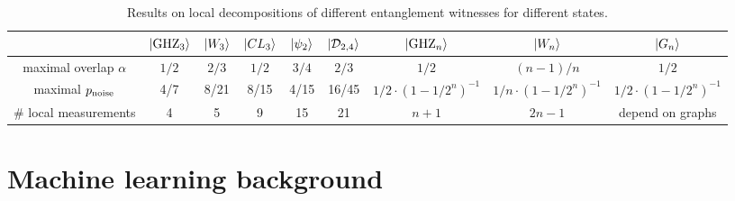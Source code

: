 \begin{table}[!ht]
\centering
\begin{tabular}{c|c|c|c|c|c|c|c|c}
	 & $\ket{\text{GHZ}_3}$ & $\ket{W_3}$ & $\ket{CL_3}$ & $\ket{\psi_2}$ & $\ket{\mathcal{D}_{2,4}}$ & $\ket{\text{GHZ}_n}$ & $\ket{W_n}$ & $\ket{G_n}$ \\
	\hline
	maximal overlap $\alpha$ & $1/2$ & $2/3$ & $1/2$ & $3/4$ & $2/3$ & $1/2$ & $(n-1)/n$ & $1/2$ \\
	maximal $p_{\text{noise}}$ & 4/7 & 8/21 & 8/15 & 4/15 & 16/45 & $1/2 \cdot (1-1/2^n)^{-1}$ & $1/n \cdot (1-1/2^n)^{-1}$ & $1/2 \cdot (1-1/2^n)^{-1}$ \\
	\# local measurements & 4 & 5 & 9 & 15 & 21 & $n+1$ & $2n-1$ & depend on graphs \\
	\hline
\end{tabular}
\caption{Results on local decompositions of different entanglement witnesses for different states. \cite{guhneEntanglementDetection2009}}
\label{tab:summary_fidelity_witness}
\end{table}

\section{Machine learning background}


